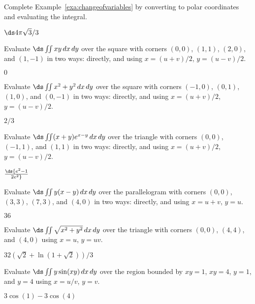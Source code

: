 \begin{enumialphparenastyle}

\begin{ex}
Complete Example~\ref{exa:changeofvariables} by
converting to polar coordinates and evaluating the integral.
\begin{sol}
$\ds 4\pi\sqrt3/3$
\end{sol}
\end{ex}

\begin{ex}
Evaluate $\ds\iint xy\,dx\,dy$ over the square
with corners $(0,0)$, $(1,1)$, $(2,0)$, and $(1,-1)$ in two ways:
directly, and using $x=(u+v)/2$, $y=(u-v)/2$.
\begin{sol}
$0$
\end{sol}
\end{ex}

\begin{ex}
Evaluate $\ds\iint x^2+y^2\,dx\,dy$ over the square
with corners $(-1,0)$, $(0,1)$, $(1,0)$, and $(0,-1)$ in two ways:
directly, and using $x=(u+v)/2$, $y=(u-v)/2$.
\begin{sol}
$2/3$
\end{sol}
\end{ex}

\begin{ex}
Evaluate $\ds\iint (x+y)e^{x-y}\,dx\,dy$ over the triangle
with corners $(0,0)$, $(-1,1)$, and $(1,1)$ in two ways:
directly, and using $x=(u+v)/2$, $y=(u-v)/2$.
\begin{sol}
$\ds {e^2-1\over 2e^2}$
\end{sol}
\end{ex}

\begin{ex}
Evaluate $\ds\iint y(x-y)\,dx\,dy$ over the parallelogram
with corners $(0,0)$, $(3,3)$, $(7,3)$, and $(4,0)$ in two ways:
directly, and using $x=u+v$, $y=u$.
\begin{sol}
$36$
\end{sol}
\end{ex}

\begin{ex}
Evaluate $\ds\iint \sqrt{x^2+y^2}\,dx\,dy$ over the
triangle with corners $(0,0)$, $(4,4)$, and $(4,0)$ using $x=u$, $y=uv$.
\begin{sol}
$32(\sqrt2+\ln(1+\sqrt2))/3$
\end{sol}
\end{ex}

\begin{ex}
Evaluate $\ds\iint y\sin(xy)\,dx\,dy$ over the
region bounded by $xy=1$, $xy=4$, $y=1$, and $y=4$ using
$x=u/v$, $y=v$.
\begin{sol}
$3\cos(1)-3\cos(4)$
\end{sol}
\end{ex}


\end{enumialphparenastyle}
